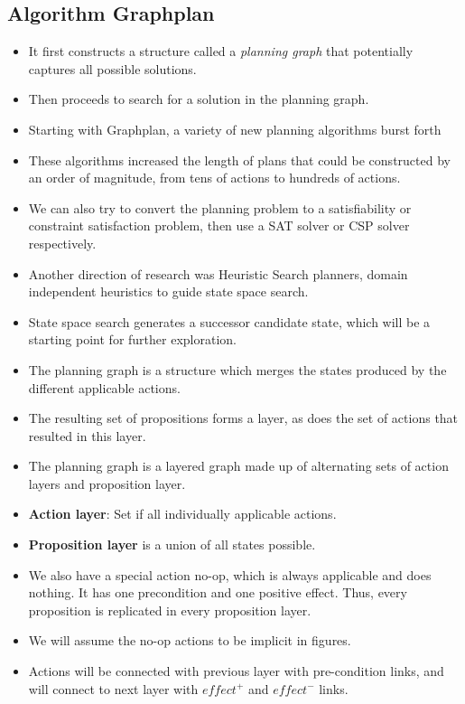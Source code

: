 \documentclass[a4paper]{article}
\begin{document}
\subsection{Algorithm Graphplan}
\begin{itemize}
    \item It first constructs a structure called a \textit{planning graph} that potentially captures all possible solutions.
    \item Then proceeds to search for a solution in the planning graph.
    \item Starting with Graphplan, a variety of new planning algorithms burst forth
    \item These algorithms increased the length of plans that could be constructed by an order of magnitude, from tens of actions to hundreds of actions.
    \item We can also try to convert the planning problem to a satisfiability or constraint satisfaction problem, then use a SAT solver or CSP solver respectively.
    \item Another direction of research was Heuristic Search planners, domain independent heuristics to guide state space search.
    \item State space search generates a successor candidate state, which will be a starting point for further exploration.
    \item The planning graph is a structure which merges the states produced by the different applicable actions.
    \item The resulting set of propositions forms a layer, as does the set of actions that resulted in this layer.
    \item The planning graph is a layered graph made up of alternating sets of action layers and proposition layer.
    \item \textbf{Action layer}: Set if all individually applicable actions.
    \item \textbf{Proposition layer} is a union of all states possible.
    \item We also have a special action no-op, which is always applicable and does nothing. It has one precondition and one positive effect. Thus, every proposition is replicated in every proposition layer.
    \item We will assume the no-op actions to be implicit in figures.
    \item Actions will be connected with previous layer with pre-condition links, and will connect to next layer with $effect^+$ and $effect^-$ links.

\end{itemize}
\end{document}
